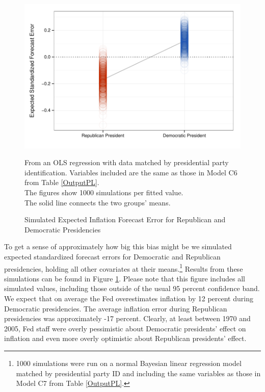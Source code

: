 \documentclass[a4paper]{article}\usepackage{graphicx, color}
\newenvironment{knitrout}{}{} %
\begin{document}
\begin{figure}[t]
    \caption{Simulated Expected Inflation Forecast Error for Republican and Democratic Presidencies}
    \label{ExpectValueParty}
    \begin{center}

\begin{knitrout}
\color{fgcolor}\includegraphics[width=0.7\linewidth]{figure/ExpectValueParty} 
\end{knitrout}

    \end{center}
    \begin{singlespace}
        {\scriptsize{From an OLS regression with data matched by presidential party identification. Variables included are the same as those in Model C6 from Table \ref{OutputPL}. \\ The figures show 1000 simulations per fitted value. \\ The solid line connects the two groups' means.}}
    \end{singlespace}
\end{figure}

To get a sense of approximately how big this bias might be we simulated expected standardized forecast errors for Democratic and Republican presidencies, holding all other covariates at their means.\footnote{1000 simulations were run on a normal Bayesian linear regression model matched by presidential party ID and including the same variables as those in Model C7 from Table \ref{OutputPL}.} Results from these simulations can be found in Figure \ref{ExpectValueParty}. Please note that this figure includes all simulated values, including those outside of the usual 95 percent confidence band. We expect that on average the Fed overestimates inflation by 12 percent during Democratic presidencies. The average inflation error during Republican presidencies was approximately -17 percent. Clearly, at least between 1970 and 2005, Fed staff were overly pessimistic about Democratic presidents' effect on inflation and even more overly optimistic about Republican presidents' effect. 
\end{document}
